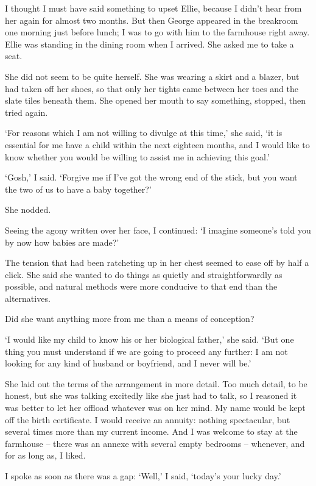 I thought I must have said something to upset Ellie, because I didn't hear from her again for almost two months. But then George appeared in the breakroom one morning just before lunch; I was to go with him to the farmhouse right away. Ellie was standing in the dining room when I arrived. She asked me to take a seat.

She did not seem to be quite herself. She was wearing a skirt and a blazer, but had taken off her shoes, so that only her tights came between her toes and the slate tiles beneath them. She opened her mouth to say something, stopped, then tried again.

`For reasons which I am not willing to divulge at this time,' she said, `it is essential for me have a child within the next eighteen months, and I would like to know whether you would be willing to assist me in achieving this goal.'

`Gosh,' I said. `Forgive me if I've got the wrong end of the stick, but you want the two of us to have a baby together?'

She nodded.

Seeing the agony written over her face, I continued: `I imagine someone's told you by now how babies are made?'

The tension that had been ratcheting up in her chest seemed to ease off by half a click. She said she wanted to do things as quietly and straightforwardly as possible, and natural methods were more conducive to that end than the alternatives.

Did she want anything more from me than a means of conception?

`I would like my child to know his or her biological father,' she said. `But one thing you must understand if we are going to proceed any further: I am not looking for any kind of husband or boyfriend, and I never will be.'

She laid out the terms of the arrangement in more detail. Too much detail, to be honest, but she was talking excitedly like she just had to talk, so I reasoned it was better to let her offload whatever was on her mind. My name would be kept off the birth certificate. I would receive an annuity: nothing spectacular, but several times more than my current income. And I was welcome to stay at the farmhouse -- there was an annexe with several empty bedrooms -- whenever, and for as long as, I liked.

I spoke as soon as there was a gap: `Well,' I said, `today's your lucky day.'

